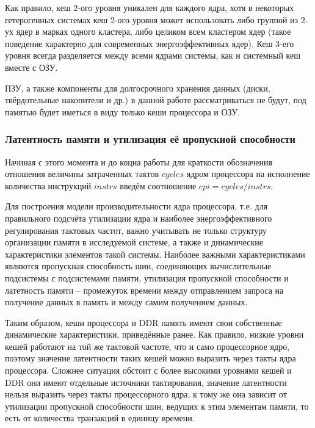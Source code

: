     Как правило, кеш 2-ого уровня уникален для каждого ядра, хотя в некоторых гетерогенных системах
    кеш 2-ого уровня может использовать либо группой из 2-ух ядер в марках одного кластера, либо
    целиком всем кластером ядер (такое поведение характерно для современных энергоэффективных ядер).
    Кеш 3-его уровня всегда разделяется между всеми ядрами системы, как и системный кеш вместе с ОЗУ.

    ПЗУ, а также компоненты для долгосрочного хранения данных (диски, твёрдотельные накопители и др.)
    в данной работе рассматриваться не будут, под памятью будет иметься в виду только кеши процессора
    и ОЗУ.

\subsubsection{Латентность памяти и утилизация её пропускной способности} \label{lat_util_chapter}

    Начиная с этого момента и до коцна работы для краткости обозначения отношения величины
    затраченных тактов $cycles$ ядром процессора на исполнение количества инструкций $instrs$
    введём соотношение $cpi = cycles / instrs$.

    Для построения модели производительности ядра процессора, т.е. для правильного подсчёта утилизации
    ядра и наиболее энергоэффективного регулирования тактовых частот, важно учитывать не только
    структуру организации памяти в исследуемой системе, а также и динамические характеристики
    элементов такой системы. Наиболее важными характеристиками являются пропускная способность шин,
    соединяющих вычислительные подсистемы с подсистемами памяти, утилизация пропускной способности и
    латетность памяти -- промежуток времени между отправлением запроса на получение данных в память и
    между самим получением данных.

    Таким образом, кеши процессора и DDR память имеют свои собственные динамические характеристики,
    приведённые ранее. Как правило, низкие уровни кешей работают на той же тактовой частоте, что
    и само процессорное ядро, поэтому значение латентности таких кешей можно выразить через такты ядра
    процессора. Сложнее ситуация обстоит с более высокими уровнями кешей и DDR они имеют отдельные
    источники тактирования, значение латентности нельзя выразить через такты процессорного ядра,
    к тому же она зависит от утилизации пропускной способности шин, ведущих к этим элементам памяти,
    то есть от количества транзакций в единицу времени.


